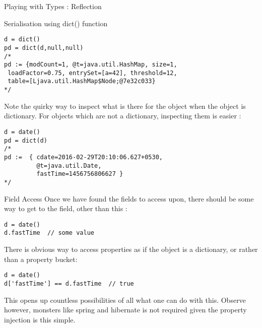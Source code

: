 \begin{section}{Playing with Types : Reflection}
\begin{subsection}{Serialisation using dict() function}
\begin{lstlisting}[style=JexlStyle]
d = dict()
pd = dict(d,null,null)
/* 
pd := {modCount=1, @t=java.util.HashMap, size=1, 
 loadFactor=0.75, entrySet=[a=42], threshold=12, 
 table=[Ljava.util.HashMap$Node;@7e32c033} 
*/
\end{lstlisting}
Note the quirky way to inspect what is there for the object when the object is dictionary.
For objects which are not a dictionary, inspecting them is easier :

\begin{lstlisting}[style=JexlStyle]
d = date()
pd = dict(d)
/* 
pd :=  { cdate=2016-02-29T20:10:06.627+0530, 
         @t=java.util.Date, 
         fastTime=1456756806627 } 
*/
\end{lstlisting}
\end{subsection}

\begin{subsection}{Field Access}
Once we have found the fields to access upon, 
there should be some way to get to the field, other than this :

\begin{lstlisting}[style=JexlStyle]
d = date()
d.fastTime  // some value 
\end{lstlisting}

There is obvious way to access properties
as if the object is a dictionary, or rather than a property bucket:
\begin{lstlisting}[style=JexlStyle]
d = date()
d['fastTime'] == d.fastTime  // true 
\end{lstlisting}
This opens up countless possibilities of all what one can do with this.
Observe however, monsters like spring and hibernate is not required 
given the property injection is this simple. 
\end{subsection}



\end{section}























